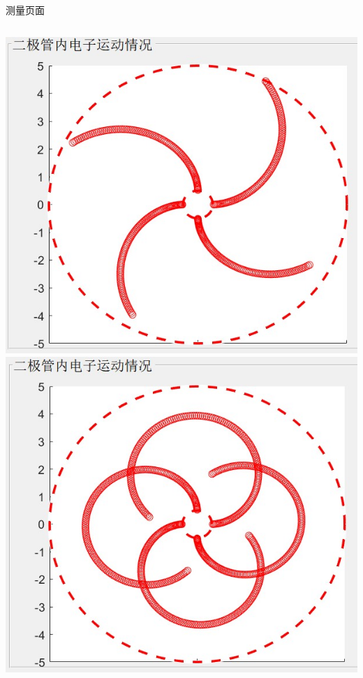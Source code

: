 \documentclass{beamer}
\begin{document}
\begin{frame}{测量页面}{\thesection \, \secname}
\begin{columns}
            \begin{column}{0.3\textwidth}
                \includegraphics[scale=0.3]{gallery/move7.jpg}
                \includegraphics[scale=0.3]{gallery/move8.jpg}
            \end{column}
        \end{columns}
    \end{frame}
\end{document}
